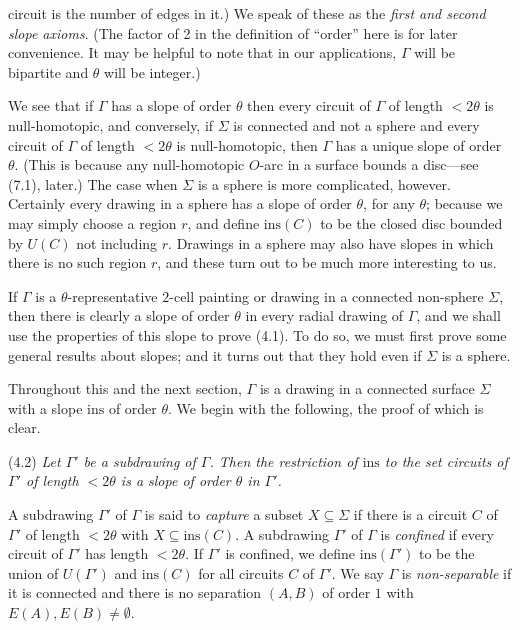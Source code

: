 \noindent circuit is the number of edges in it.) We speak of these as the \textit{first and second slope axioms}. (The factor of 2 in the definition of ``order'' here is for later convenience. It may be helpful to note that in our applications, $\Gamma$ will be bipartite and $\theta$ will be integer.)

We see that if $\Gamma$ has a slope of order $\theta$ then every circuit of $\Gamma$ of length $< 2\theta$ is null-homotopic, and conversely, if $\Sigma$ is connected and not a sphere and every circuit of $\Gamma$ of length $< 2\theta$ is null-homotopic, then $\Gamma$ has a unique slope of order $\theta$. (This is because any null-homotopic $O$-arc in a surface bounds a disc---see (7.1), later.) The case when $\Sigma$ is a sphere is more complicated, however. Certainly every drawing in a sphere has a slope of order $\theta$, for any $\theta$; because we may simply choose a region $r$, and define $\text{ins}(C)$ to be the closed disc bounded by $U(C)$ not including $r$. Drawings in a sphere may also have slopes in which there is no such region $r$, and these turn out to be much more interesting to us.

If $\Gamma$ is a $\theta$-representative $2$-cell painting or drawing in a connected non-sphere $\Sigma$, then there is clearly a slope of order $\theta$ in every radial drawing of $\Gamma$, and we shall use the properties of this slope to prove (4.1). To do so, we must first prove some general results about slopes; and it turns out that they hold even if $\Sigma$ is a sphere.

Throughout this and the next section, $\Gamma$ is a drawing in a connected surface $\Sigma$ with a slope $\text{ins}$ of order $\theta$. We begin with the following, the proof of which is clear.

\stmt
(4.2) \textit{Let $\Gamma'$ be a subdrawing of $\Gamma$. Then the restriction of $\text{ins}$ to the set circuits of $\Gamma'$ of length $< 2\theta$ is a slope of order $\theta$ in $\Gamma'$.}

A subdrawing $\Gamma'$ of $\Gamma$ is said to \textit{capture} a subset $X \subseteq \Sigma$ if there is a circuit $C$ of $\Gamma'$ of length $< 2\theta$ with $X \subseteq \text{ins}(C)$. A subdrawing $\Gamma'$ of $\Gamma$ is \textit{confined} if every circuit of $\Gamma'$ has length $< 2\theta$. If $\Gamma'$ is confined, we define $\text{ins}(\Gamma')$ to be the union of $U(\Gamma')$ and $\text{ins}(C)$ for all circuits $C$ of $\Gamma'$. We say $\Gamma$ is \textit{non-separable} if it is connected and there is no separation $(A, B)$ of order $1$ with $E(A), E(B) \ne \emptyset$.

